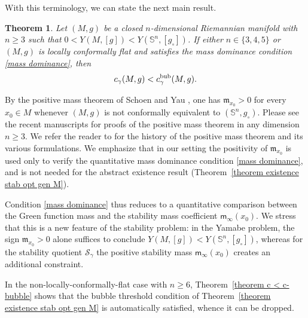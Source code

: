 \documentclass[reqno,11pt]{amsart}
\numberwithin{equation}{section}
\newtheorem{theorem}{Theorem}[section]
\theoremstyle{definition}
\theoremstyle{remark}
\newcommand{\Ss}{\mathbb{S}}
\begin{document}
With this terminology, we can state the next main result.

\begin{theorem}
\label{theorem Schoen}
Let $(M,g)$ be a closed $n$-dimensional Riemannian manifold with $n \geqslant 3$ 
such that $0 < Y(M,[g]) < Y(\Ss^n,[g_\circ])$. If either $n 
\in \{3,4,5\}$ or $(M,g)$ is locally conformally flat and satisfies the mass 
dominance condition \eqref{mass dominance}, then
\[
c_{\gamma}(M,g) < c_{\gamma}^{\rm bub}(M,g).
\]
\end{theorem}

By the positive mass theorem of Schoen and Yau \cite{SY1, SY_PMT2,witten}, one 
has $\mathfrak{m}_{x_0} > 0$ 
for every $x_0 \in M$ whenever $(M,g)$ is not conformally equivalent to $(\Ss^n, g_\circ)$. 
Please see the recent manuscripts \cite{pmt_dim19, brendle_pmt} for proofs 
of the positive mass theorem in any dimension $n \geqslant 3$. 
We refer the reader to \cite{SY1, SY_PMT2, witten, pmt_dim19, brendle_pmt} for the history of the positive mass theorem 
and its various formulations. We emphasize that in our setting the positivity of $\mathfrak{m}_{x_0}$ is used only to verify 
the quantitative mass dominance condition \eqref{mass dominance}, and is not needed for the abstract existence result 
(Theorem~\ref{theorem existence stab opt gen M}).

Condition \eqref{mass dominance} thus reduces to a quantitative comparison between the 
Green function mass and the stability mass coefficient
$\mathsf{m}_\infty(x_0)$. We stress that
this is a new feature of the stability problem: in the Yamabe problem, the
sign $\mathfrak{m}_{x_0} > 0$ alone suffices to conclude $Y(M,[g]) < Y(\Ss^n,[g_\circ])$,
whereas for the stability quotient $\mathcal{S}_\gamma$ the positive stability mass $\mathsf{m}_\infty(x_0)$ creates
an additional constraint.

In the non-locally-conformally-flat case with $n \geqslant 6$, Theorem~\ref{theorem c < c-bubble}
shows that the bubble threshold condition of Theorem~\ref{theorem existence stab opt gen M} is
automatically satisfied, whence it can be dropped.
\end{document}
